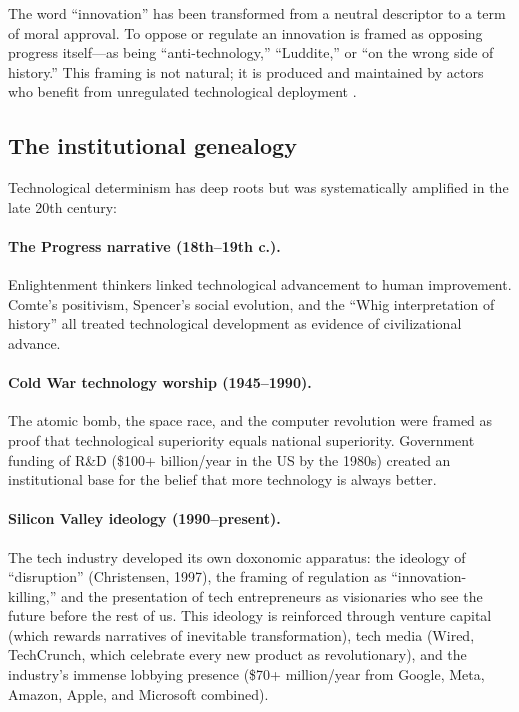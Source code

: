 The word ``innovation'' has been transformed from a neutral descriptor to a term of moral approval.
To oppose or regulate an innovation is framed as opposing progress itself---as being ``anti-technology,'' ``Luddite,'' or ``on the wrong side of history.''
This framing is not natural; it is produced and maintained by actors who benefit from unregulated technological deployment \autocite{winner1986}.

\subsection{The institutional genealogy}

Technological determinism has deep roots but was systematically amplified in the late 20th century:

\paragraph{The Progress narrative (18th--19th c.).}
Enlightenment thinkers linked technological advancement to human improvement.
Comte's positivism, Spencer's social evolution, and the ``Whig interpretation of history'' all treated technological development as evidence of civilizational advance.

\paragraph{Cold War technology worship (1945--1990).}
The atomic bomb, the space race, and the computer revolution were framed as proof that technological superiority equals national superiority.
Government funding of R\&D (\$100+ billion/year in the US by the 1980s) created an institutional base for the belief that more technology is always better.

\paragraph{Silicon Valley ideology (1990--present).}
The tech industry developed its own doxonomic apparatus: the ideology of ``disruption'' (Christensen, 1997), the framing of regulation as ``innovation-killing,'' and the presentation of tech entrepreneurs as visionaries who see the future before the rest of us.
This ideology is reinforced through venture capital (which rewards narratives of inevitable transformation), tech media (Wired, TechCrunch, which celebrate every new product as revolutionary), and the industry's immense lobbying presence (\$70+ million/year from Google, Meta, Amazon, Apple, and Microsoft combined).

